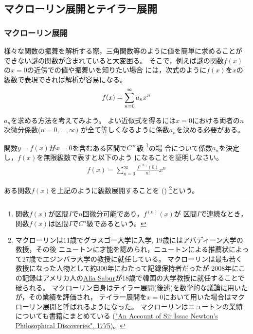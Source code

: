\documentclass[twocolumn,11pt]{jarticle}
\begin{document}
\subsection{マクローリン展開とテイラー展開}

\subsubsection{マクローリン展開}

様々な関数の振舞を解析する際，三角関数等のように値を簡単に求めることが
できない謎の関数が含まれていると大変困る。
そこで，例えば謎の関数$f(x)$の$x=0$の近傍での値や振舞いを知りたい場合
には，次式のように$f(x)$を$x$の級数で表現できれば解析が容易になる。
\begin{align}
  f(x)=\sum_{n=0}^{\infty}a_nx^n\notag
\end{align}

\nquestion
$a_n$を求める方法を考えてみよう。
よい近似式を得るには$x=0$における両者の$n$次微分係数($n=0,...,\infty)$
が全て等しくなるように係数$a_n$を決める必要がある。

関数$y=f(x)$が$x=0$を含むある区間で$C^\infty$級
\footnote{関数$f(x)$が区間$I$で$n$回微分可能であり，$f^{(n)}(x)$が
  区間$I$で連続なとき，関数$f(x)$は区間$I$で$C^n$級であるという。}の場
合について係数$a_n$を決定し，$f(x)$を無限級数で表すと以下のよう
になることを証明しなさい。
\begin{align}
  f(x)=\sum_{n=0}^{\infty}\frac{f^{(n)}(0)}{n!}x^n
 \label{eq:Maclaurin}
\end{align}

\comment
ある関数$f(x)$を上記のように級数展開することを
()
\footnote{
マクローリンは11歳でグラスゴー大学に入学, 19歳にはアバディーン大学の教授，その後
ニュートンに才能を認められ，ニュートンによる推薦状によって27歳でエジンバラ大学の教授に就任している。
マクローリンは最も若く教授になった人物として約300年にわたって記録保持者だったが
2008年にこの記録はアメリカ人の\href{https://en.wikipedia.org/wiki/Alia_Sabur}{Alia Sabur}が18歳で韓国の大学教授に就任することで破られる。
マクローリン自身はテイラー展開(後述)を数学的な議論に用いたが，その業績を評価され，
テイラー展開を$x=0$において用いた場合はマクローリン展開と呼ばれるようになった。
マクローリンはニュートンの業績についても書籍にまとめている
(\href{https://archive.org/details/anaccountsirisa00murdgoog}{"An Account of Sir Issac Newton's Philosophical Discoveries", 1775})。
}という。
\end{document}
